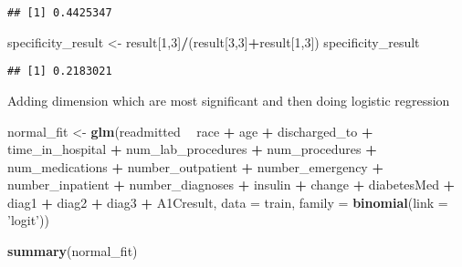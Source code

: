 \documentclass[]{article}
\newenvironment{Shaded}{\begin{snugshade}}{\end{snugshade}}
\newcommand{\KeywordTok}[1]{\textcolor[rgb]{0.13,0.29,0.53}{\textbf{#1}}}
\newcommand{\DataTypeTok}[1]{\textcolor[rgb]{0.13,0.29,0.53}{#1}}
\newcommand{\DecValTok}[1]{\textcolor[rgb]{0.00,0.00,0.81}{#1}}
\newcommand{\StringTok}[1]{\textcolor[rgb]{0.31,0.60,0.02}{#1}}
\newcommand{\OperatorTok}[1]{\textcolor[rgb]{0.81,0.36,0.00}{\textbf{#1}}}
\newcommand{\NormalTok}[1]{#1}
\begin{document}
\begin{verbatim}
## [1] 0.4425347
\end{verbatim}

\begin{Shaded}
\begin{Highlighting}[]
\NormalTok{specificity_result <-}\StringTok{ }\NormalTok{result[}\DecValTok{1}\NormalTok{,}\DecValTok{3}\NormalTok{]}\OperatorTok{/}\NormalTok{(result[}\DecValTok{3}\NormalTok{,}\DecValTok{3}\NormalTok{]}\OperatorTok{+}\NormalTok{result[}\DecValTok{1}\NormalTok{,}\DecValTok{3}\NormalTok{])}
\NormalTok{specificity_result}
\end{Highlighting}
\end{Shaded}

\begin{verbatim}
## [1] 0.2183021
\end{verbatim}

Adding dimension which are most significant and then doing logistic
regression

\begin{Shaded}
\begin{Highlighting}[]
\NormalTok{normal_fit <-}\StringTok{ }\KeywordTok{glm}\NormalTok{(readmitted }\OperatorTok{~}\StringTok{ }\NormalTok{race }\OperatorTok{+}\StringTok{ }\NormalTok{age }\OperatorTok{+}\StringTok{ }\NormalTok{discharged_to }\OperatorTok{+}\StringTok{ }\NormalTok{time_in_hospital }\OperatorTok{+}
\StringTok{             }\NormalTok{num_lab_procedures }\OperatorTok{+}\StringTok{ }\NormalTok{num_procedures }\OperatorTok{+}\StringTok{ }\NormalTok{num_medications }\OperatorTok{+}\StringTok{ }\NormalTok{number_outpatient }\OperatorTok{+}
\StringTok{             }\NormalTok{number_emergency }\OperatorTok{+}\StringTok{ }\NormalTok{number_inpatient }\OperatorTok{+}\StringTok{ }\NormalTok{number_diagnoses }\OperatorTok{+}
\StringTok{             }\NormalTok{insulin }\OperatorTok{+}\StringTok{ }\NormalTok{change }\OperatorTok{+}\StringTok{ }\NormalTok{diabetesMed }\OperatorTok{+}\StringTok{ }\NormalTok{diag1 }\OperatorTok{+}\StringTok{ }\NormalTok{diag2 }\OperatorTok{+}\StringTok{ }\NormalTok{diag3 }\OperatorTok{+}\StringTok{ }\NormalTok{A1Cresult, }
             \DataTypeTok{data =}\NormalTok{ train, }\DataTypeTok{family =} \KeywordTok{binomial}\NormalTok{(}\DataTypeTok{link =} \StringTok{'logit'}\NormalTok{))}

\KeywordTok{summary}\NormalTok{(normal_fit)}
\end{Highlighting}
\end{Shaded}
\end{document}
